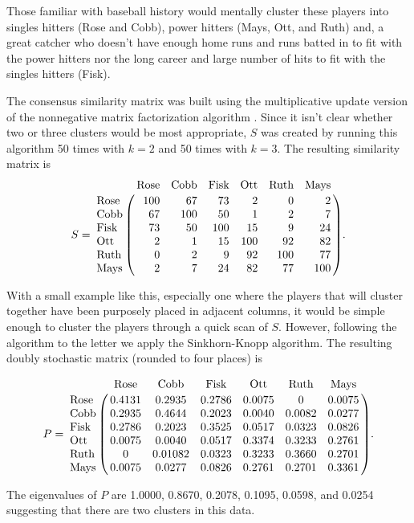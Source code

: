\documentclass[final]{siamltex}
\begin{document}
Those familiar with baseball history would mentally cluster these players into singles hitters (Rose and Cobb), power hitters (Mays, Ott, and Ruth) and, a great catcher who doesn't have enough home runs and runs batted in to fit with the power hitters nor the long career and large number of hits to fit with the singles hitters (Fisk). 

The consensus similarity matrix was built using  the multiplicative update version of the nonnegative matrix factorization algorithm \cite{leeseung}. Since it isn't clear whether two or three clusters would be most appropriate, $S$ was created by running this algorithm 50 times with $k=2$ and 50 times with $k=3$. The resulting similarity matrix is
\[
S=\bordermatrix{ & \mbox{Rose} & \mbox{Cobb} & \mbox{Fisk} & \mbox{Ott} & \mbox{Ruth} & \mbox{Mays} \cr
\mbox{Rose} &  \hfill 100 & \hfill 67 & \hfill 73 & \hfill 2 & \hfill 0 & \hfill 2 \cr
\mbox{Cobb} &  \hfill 67 & \hfill 100 & \hfill 50 & \hfill 1 & \hfill 2 & \hfill 7 \cr
\mbox{Fisk} & \hfill 73 & \hfill 50 & \hfill 100 & \hfill 15 & \hfill 9 & \hfill 24 \cr
\mbox{Ott} &  \hfill 2 & \hfill 1 & \hfill 15 & \hfill 100 & \hfill 92 & \hfill 82 \cr
\mbox{Ruth} &  \hfill 0 & \hfill 2 & \hfill 9 & \hfill 92 & \hfill 100 & \hfill 77 \cr
\mbox{Mays} &  \hfill 2 & \hfill 7 & \hfill 24 & \hfill 82 & \hfill 77 & \hfill 100  } .
\]

With a small example like this, especially one where the players that will cluster together have been purposely placed in adjacent columns, it would be simple enough to cluster the players through a quick scan of $S$. However, following the algorithm to the letter we apply the Sinkhorn-Knopp algorithm. The resulting doubly stochastic matrix (rounded to four places) is 

\[
P=\bordermatrix{ & \mbox{Rose} & \mbox{Cobb} & \mbox{Fisk} & \mbox{Ott} & \mbox{Ruth} & \mbox{Mays} \cr
\mbox{Rose} & 0.4131 &  0.2935  &  0.2786  &   0.0075   &      0        &  0.0075\cr
\mbox{Cobb} &0.2935   & 0.4644  &   0.2023 &   0.0040   &   0.0082 &  0.0277\cr
\mbox{Fisk}   &0.2786   &   0.2023 &  0.3525  &   0.0517   &   0.0323 &  0.0826\cr
\mbox{Ott}      &0.0075   &  0.0040  &  0.0517  &  0.3374    &  0.3233  &  0.2761\cr
\mbox{Ruth}  &0             &  0.01082 &  0.0323  &   0.3233  &   0.3660  & 0.2701\cr
\mbox{Mays}  &0.0075   &  0.0277  &  0.0826  &   0.2761  &   0.2701  &  0.3361 } .
\]

The eigenvalues of $P$ are 1.0000,  0.8670,  0.2078, 0.1095, 0.0598,  and 0.0254 suggesting that there are two clusters in this data.
\end{document}
